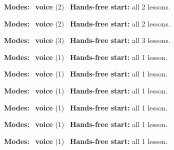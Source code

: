 \expandafter\def\csname hlchaptermodality150\endcsname{%
  {\small\noindent
    \textbf{Modes:} \hlvoicesign{}~\textbf{voice} (2)\quad
    \hlvoicesign{}~\textbf{Hands-free start:} all 2 lessons.%
    \par}\medskip
}

\expandafter\def\csname hlchaptermodality151\endcsname{%
  {\small\noindent
    \textbf{Modes:} \hlvoicesign{}~\textbf{voice} (2)\quad
    \hlvoicesign{}~\textbf{Hands-free start:} all 2 lessons.%
    \par}\medskip
}

\expandafter\def\csname hlchaptermodality152\endcsname{%
  {\small\noindent
    \textbf{Modes:} \hlvoicesign{}~\textbf{voice} (3)\quad
    \hlvoicesign{}~\textbf{Hands-free start:} all 3 lessons.%
    \par}\medskip
}

\expandafter\def\csname hlchaptermodality153\endcsname{%
  {\small\noindent
    \textbf{Modes:} \hlvoicesign{}~\textbf{voice} (1)\quad
    \hlvoicesign{}~\textbf{Hands-free start:} all 1 lesson.%
    \par}\medskip
}

\expandafter\def\csname hlchaptermodality154\endcsname{%
  {\small\noindent
    \textbf{Modes:} \hlvoicesign{}~\textbf{voice} (1)\quad
    \hlvoicesign{}~\textbf{Hands-free start:} all 1 lesson.%
    \par}\medskip
}

\expandafter\def\csname hlchaptermodality155\endcsname{%
  {\small\noindent
    \textbf{Modes:} \hlvoicesign{}~\textbf{voice} (1)\quad
    \hlvoicesign{}~\textbf{Hands-free start:} all 1 lesson.%
    \par}\medskip
}

\expandafter\def\csname hlchaptermodality156\endcsname{%
  {\small\noindent
    \textbf{Modes:} \hlvoicesign{}~\textbf{voice} (1)\quad
    \hlvoicesign{}~\textbf{Hands-free start:} all 1 lesson.%
    \par}\medskip
}

\expandafter\def\csname hlchaptermodality157\endcsname{%
  {\small\noindent
    \textbf{Modes:} \hlvoicesign{}~\textbf{voice} (1)\quad
    \hlvoicesign{}~\textbf{Hands-free start:} all 1 lesson.%
    \par}\medskip
}

\expandafter\def\csname hlchaptermodality158\endcsname{%
  {\small\noindent
    \textbf{Modes:} \hlvoicesign{}~\textbf{voice} (1)\quad
    \hlvoicesign{}~\textbf{Hands-free start:} all 1 lesson.%
    \par}\medskip
}

